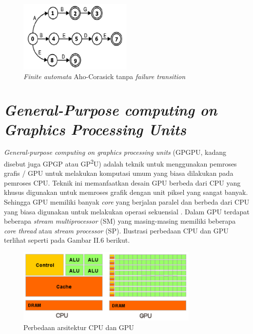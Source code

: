     \begin{figure}[htb]
      \centering
      \includegraphics[width=0.5\textwidth]{resources/pfac.png}
      \caption[\emph{Finite automata} Aho-Corasick tanpa \emph{failure transition}]{\emph{Finite automata} Aho-Corasick tanpa \emph{failure transition} \citep{lin2013}}
    \end{figure}
    
\section{\emph{General-Purpose computing on Graphics Processing Units}}
  
  \emph{General-purpose computing on graphics processing units} (GPGPU, kadang disebut juga GPGP atau GP\textsuperscript{2}U) adalah teknik untuk menggunakan pemroses grafis / GPU untuk melakukan komputasi umum yang biasa dilakukan pada pemroses CPU. Teknik ini memanfaatkan desain GPU berbeda dari CPU yang khusus digunakan untuk memroses grafik dengan unit piksel yang sangat banyak. Sehingga GPU memiliki banyak \emph{core} yang berjalan paralel dan berbeda dari CPU yang biasa digunakan untuk melakukan operasi sekuensial \citep{lindholm2001}. Dalam GPU terdapat beberapa \emph{stream multiprocessor} (SM) yang masing-masing memiliki beberapa \emph{core thread} atau \emph{stream processor} (SP). Ilustrasi perbedaan CPU dan GPU terlihat seperti pada Gambar II.6 berikut.

    
  \begin{figure}[htb]
    \centering
    \includegraphics[width=0.8\textwidth]{resources/GPUvsCPU.png}
    \caption[Perbedaan arsitektur CPU dan GPU]{Perbedaan arsitektur CPU dan GPU \citep{cuda}}
  \end{figure}
    
